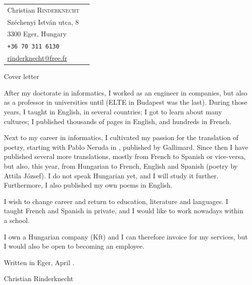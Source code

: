\documentclass[a4paper,11pt]{article}
\begin{document}
\noindent
\begin{tabular}{@{}l@{\qquad\qquad\qquad}r@{}}
  Christian \textsc{Rinderknecht}
  & \\
  Széchenyi István utca, 8
  & \\
  3300 Eger, Hungary \\
  \texttt{+36 70 311 6130} \\
  \url{rinderknecht@free.fr}
\end{tabular}

\bigskip

\begin{center}
  \large Cover letter
\end{center}

\bigskip

After my doctorate in informatics, I worked as an engineer in
companies, but also as a professor in universities until
 (ELTE in Budapest was the last). During those
years, I taught in English, in several countries; I got to learn about
many cultures; I published thousands of pages in English, and hundreds
in French.

Next to my career in informatics, I cultivated my passion for the
translation of poetry, starting with Pablo Neruda in
, published by Gallimard. Since then I have
published several more translations, mostly from French to Spanish or
vice\hyp{}versa, but also, this year, from Hungarian to French,
English and Spanish (poetry by Attila József). I do not speak
Hungarian yet, and I will study it further. Furthermore, I also
published my own poems in English.

I wish to change career and return to education, literature and
languages. I taught French and Spanish in private, and I would like to
work nowadays within a school.

I own a Hungarian company (Kft) and I can therefore invoice for my
services, but I would also be open to becoming an employee.

\bigskip
\bigskip

\hfill Written in Eger,  April .

\bigskip
\bigskip
\bigskip
\bigskip
\hfill Christian Rinderknecht

\bigskip
\end{document}
